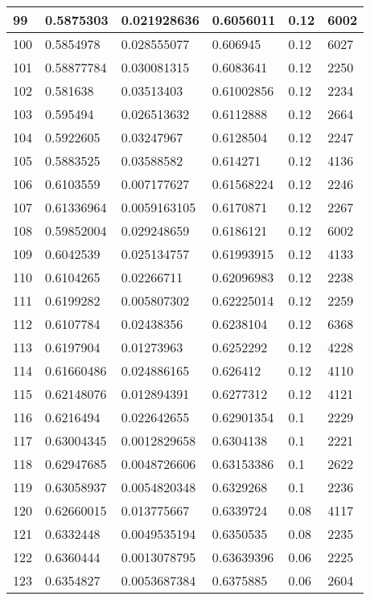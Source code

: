 \begin{longtable}{|l|l|l|l|l|l|}
99 & 0.5875303 & 0.021928636 & 0.6056011 & 0.12 & 6002 \\ \hline 
100 & 0.5854978 & 0.028555077 & 0.606945 & 0.12 & 6027 \\ \hline 
101 & 0.58877784 & 0.030081315 & 0.6083641 & 0.12 & 2250 \\ \hline 
102 & 0.581638 & 0.03513403 & 0.61002856 & 0.12 & 2234 \\ \hline 
103 & 0.595494 & 0.026513632 & 0.6112888 & 0.12 & 2664 \\ \hline 
104 & 0.5922605 & 0.03247967 & 0.6128504 & 0.12 & 2247 \\ \hline 
105 & 0.5883525 & 0.03588582 & 0.614271 & 0.12 & 4136 \\ \hline 
106 & 0.6103559 & 0.007177627 & 0.61568224 & 0.12 & 2246 \\ \hline 
107 & 0.61336964 & 0.0059163105 & 0.6170871 & 0.12 & 2267 \\ \hline 
108 & 0.59852004 & 0.029248659 & 0.6186121 & 0.12 & 6002 \\ \hline 
109 & 0.6042539 & 0.025134757 & 0.61993915 & 0.12 & 4133 \\ \hline 
110 & 0.6104265 & 0.02266711 & 0.62096983 & 0.12 & 2238 \\ \hline 
111 & 0.6199282 & 0.005807302 & 0.62225014 & 0.12 & 2259 \\ \hline 
112 & 0.6107784 & 0.02438356 & 0.6238104 & 0.12 & 6368 \\ \hline 
113 & 0.6197904 & 0.01273963 & 0.6252292 & 0.12 & 4228 \\ \hline 
114 & 0.61660486 & 0.024886165 & 0.626412 & 0.12 & 4110 \\ \hline 
115 & 0.62148076 & 0.012894391 & 0.6277312 & 0.12 & 4121 \\ \hline 
116 & 0.6216494 & 0.022642655 & 0.62901354 & 0.1 & 2229 \\ \hline 
117 & 0.63004345 & 0.0012829658 & 0.6304138 & 0.1 & 2221 \\ \hline 
118 & 0.62947685 & 0.0048726606 & 0.63153386 & 0.1 & 2622 \\ \hline 
119 & 0.63058937 & 0.0054820348 & 0.6329268 & 0.1 & 2236 \\ \hline 
120 & 0.62660015 & 0.013775667 & 0.6339724 & 0.08 & 4117 \\ \hline 
121 & 0.6332448 & 0.0049535194 & 0.6350535 & 0.08 & 2235 \\ \hline 
122 & 0.6360444 & 0.0013078795 & 0.63639396 & 0.06 & 2225 \\ \hline 
123 & 0.6354827 & 0.0053687384 & 0.6375885 & 0.06 & 2604 \\ \hline 

\end{longtable}
